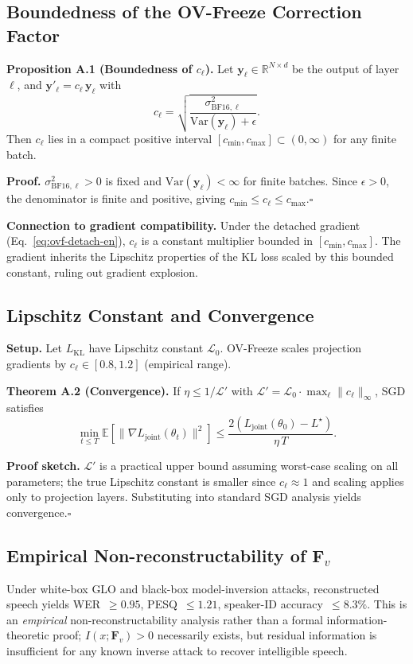\documentclass[final,5p,times,number]{elsarticle}
\begin{document}
\subsection{Boundedness of the OV-Freeze Correction Factor}\label{app:bounded}

\noindent\textbf{Proposition A.1 (Boundedness of $c_\ell$).} Let $\bm{y}_\ell\in\mathbb{R}^{N\times d}$ be the output of layer $\ell$, and $\bm{y}'_\ell = c_\ell\,\bm{y}_\ell$ with
\[
c_\ell = \sqrt{\frac{\sigma^2_{\mathrm{BF16},\ell}}{\mathrm{Var}(\bm{y}_\ell)+\epsilon}}.
\]
Then $c_\ell$ lies in a compact positive interval $[c_{\min}, c_{\max}] \subset (0, \infty)$ for any finite batch.

\noindent\textbf{Proof.} $\sigma^2_{\mathrm{BF16},\ell}>0$ is fixed and $\mathrm{Var}(\bm{y}_\ell)<\infty$ for finite batches. Since $\epsilon>0$, the denominator is finite and positive, giving $c_{\min}\le c_\ell\le c_{\max}$.\hfill$\square$

\medskip
\noindent\textbf{Connection to gradient compatibility.} Under the detached gradient (Eq.~\eqref{eq:ovf-detach-en}), $c_\ell$ is a constant multiplier bounded in $[c_{\min}, c_{\max}]$. The gradient inherits the Lipschitz properties of the KL loss scaled by this bounded constant, ruling out gradient explosion.

\subsection{Lipschitz Constant and Convergence}\label{app:lipschitz}

\noindent\textbf{Setup.} Let $L_{\mathrm{KL}}$ have Lipschitz constant $\mathcal{L}_0$. OV-Freeze scales projection gradients by $c_\ell\in[0.8,1.2]$ (empirical range).

\noindent\textbf{Theorem A.2 (Convergence).} If $\eta\le 1/\mathcal{L}'$ with $\mathcal{L}' = \mathcal{L}_0\cdot\max_\ell\|c_\ell\|_\infty$, SGD satisfies
\[
\min_{t\le T}\mathbb{E}[\|\nabla L_{\mathrm{joint}}(\theta_t)\|^2] \le \frac{2(L_{\mathrm{joint}}(\theta_0) - L^\star)}{\eta\,T}.
\]

\noindent\textbf{Proof sketch.} $\mathcal{L}'$ is a practical upper bound assuming worst-case scaling on all parameters; the true Lipschitz constant is smaller since $c_\ell\approx 1$ and scaling applies only to projection layers. Substituting into standard SGD analysis yields convergence.\hfill$\square$

\subsection{Empirical Non-reconstructability of $\bm{F}_v$}\label{app:nonrecon}

Under white-box GLO and black-box model-inversion attacks, reconstructed speech yields WER~$\ge 0.95$, PESQ~$\le 1.21$, speaker-ID accuracy~$\le 8.3\%$. This is an \emph{empirical} non-reconstructability analysis rather than a formal information-theoretic proof; $I(x;\bm{F}_v)>0$ necessarily exists, but residual information is insufficient for any known inverse attack to recover intelligible speech.

\balance



\end{document}
